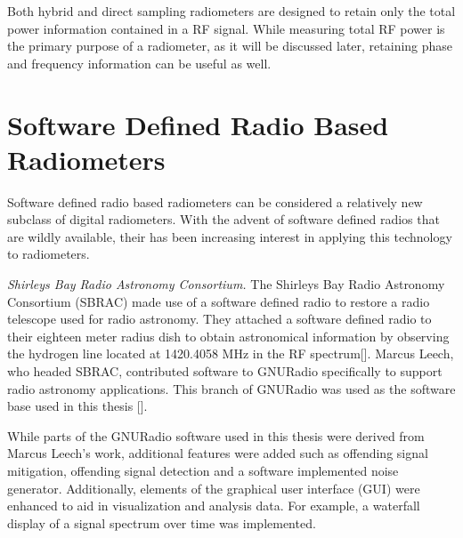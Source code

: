 Both hybrid and direct sampling radiometers are designed to retain only the total power information contained in a RF signal.  While measuring total RF power is the primary purpose of a radiometer, as it will be discussed later, retaining phase and frequency information can be useful as well.

\section{Software Defined Radio Based Radiometers}

Software defined radio based radiometers can be considered a relatively new subclass of digital radiometers.  With the advent of software defined radios that are wildly available, their has been increasing interest in applying this technology to radiometers.



\emph{Shirleys Bay Radio Astronomy Consortium.}  The Shirleys Bay Radio Astronomy Consortium (SBRAC) made use of a software defined radio to restore a radio telescope used for radio astronomy.  They attached a software defined radio to their eighteen meter radius dish to obtain astronomical information by observing the hydrogen line located at 1420.4058 MHz in the RF spectrum[\cite{Leech2007}].  Marcus Leech, who headed SBRAC, contributed software to GNURadio specifically to support radio astronomy applications.  This branch of GNURadio was used as the software base used in this thesis [\cite{Leech}].

While parts of the GNURadio software used in this thesis were derived from Marcus Leech's work, additional features were added such as offending signal mitigation, offending signal detection and a software implemented noise generator.  Additionally, elements of the graphical user interface (GUI) were enhanced to aid in visualization and analysis data.  For example, a waterfall display of a signal spectrum over time was implemented.

